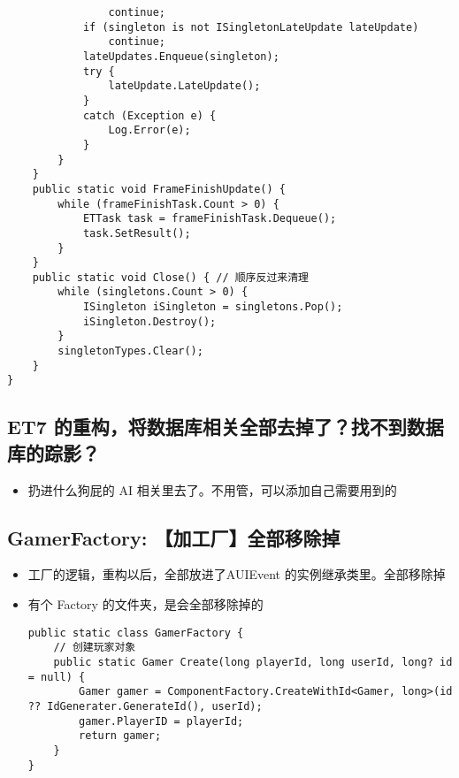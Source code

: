 \documentclass[9pt, b5paper]{article}
\begin{document}
\begin{verbatim}
                continue;
            if (singleton is not ISingletonLateUpdate lateUpdate) 
                continue;
            lateUpdates.Enqueue(singleton);
            try {
                lateUpdate.LateUpdate();
            }
            catch (Exception e) {
                Log.Error(e);
            }
        }
    }
    public static void FrameFinishUpdate() {
        while (frameFinishTask.Count > 0) {
            ETTask task = frameFinishTask.Dequeue();
            task.SetResult();
        }
    }
    public static void Close() { // 顺序反过来清理
        while (singletons.Count > 0) {
            ISingleton iSingleton = singletons.Pop();
            iSingleton.Destroy();
        }
        singletonTypes.Clear();
    }
}
\end{verbatim}
\subsection{ET7 的重构，将数据库相关全部去掉了？找不到数据库的踪影？}
\label{sec-7-3}
\begin{itemize}
\item 扔进什么狗屁的 AI 相关里去了。不用管，可以添加自己需要用到的
\end{itemize}
\subsection{GamerFactory: 【加工厂】全部移除掉}
\label{sec-7-4}
\begin{itemize}
\item 工厂的逻辑，重构以后，全部放进了AUIEvent 的实例继承类里。全部移除掉
\item 有个 Factory 的文件夹，是会全部移除掉的
\begin{verbatim}
public static class GamerFactory {
    // 创建玩家对象
    public static Gamer Create(long playerId, long userId, long? id = null) {
        Gamer gamer = ComponentFactory.CreateWithId<Gamer, long>(id ?? IdGenerater.GenerateId(), userId);
        gamer.PlayerID = playerId;
        return gamer;
    }
}
\end{verbatim}
\end{itemize}
\end{document}
